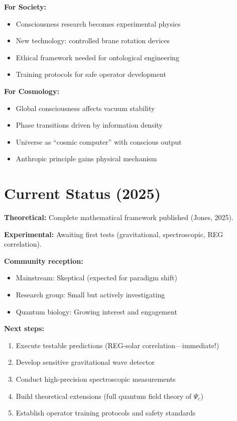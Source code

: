 \textbf{For Society:}
\begin{itemize}
\item Consciousness research becomes experimental physics
\item New technology: controlled brane rotation devices
\item Ethical framework needed for ontological engineering
\item Training protocols for safe operator development
\end{itemize}

\textbf{For Cosmology:}
\begin{itemize}
\item Global consciousness affects vacuum stability
\item Phase transitions driven by information density
\item Universe as ``cosmic computer'' with conscious output
\item Anthropic principle gains physical mechanism
\end{itemize}

\section{Current Status (2025)}
\label{sec:status}

\textbf{Theoretical:} Complete mathematical framework published (Jones, 2025).

\textbf{Experimental:} Awaiting first tests (gravitational, spectroscopic, REG correlation).

\textbf{Community reception:}
\begin{itemize}
\item Mainstream: Skeptical (expected for paradigm shift)
\item Research group: Small but actively investigating
\item Quantum biology: Growing interest and engagement
\end{itemize}

\textbf{Next steps:}
\begin{enumerate}
\item Execute testable predictions (REG-solar correlation---immediate!)
\item Develop sensitive gravitational wave detector
\item Conduct high-precision spectroscopic measurements
\item Build theoretical extensions (full quantum field theory of $\Psi_c$)
\item Establish operator training protocols and safety standards
\end{enumerate}

